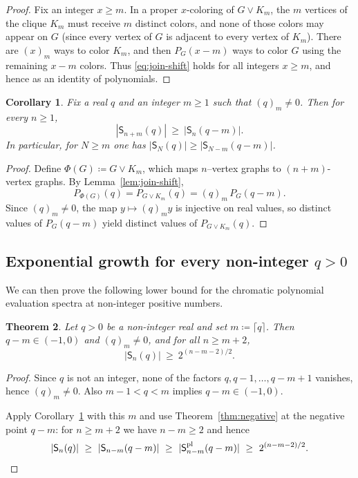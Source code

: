 \documentclass[A4paper,reqno,oneside,12pt]{amsart}
\theoremstyle{plain}
\newtheorem{theorem}{Theorem}[section]
\newtheorem{corollary}[theorem]{Corollary}
\theoremstyle{definition}
\DeclareMathOperator{\pl}{\mathrm{pl}}
\begin{document}
\begin{proof}
Fix an integer $x\ge m$.
In a proper $x$-coloring of $G\vee K_m$, the $m$ vertices of the clique $K_m$ must receive $m$ distinct colors,
and none of those colors may appear on $G$ (since every vertex of $G$ is adjacent to every vertex of $K_m$).
There are $(x)_m$ ways to color $K_m$, and then $P_G(x-m)$ ways to color $G$ using the remaining $x-m$ colors.
Thus \eqref{eq:join-shift} holds for all integers $x\ge m$, and hence as an identity of polynomials.
\end{proof}

\begin{corollary}\label{cor:spectral-embed}Fix a real $q$ and an integer $m\ge 1$ such that $(q)_m\neq 0$.
Then for every $n\ge 1$,
\[
|\mathsf{S}_{n+m}(q)| \ \ge\ |\mathsf{S}_n (q-m)|.
\]
In particular, for $N\ge m$ one has $|\mathsf{S}_N (q)|\ge |\mathsf{S}_{N-m}(q-m)|$.
\end{corollary}

\begin{proof}
Define $\Phi(G)\coloneqq G\vee K_m$, which maps $n$--vertex graphs to $(n+m)$-vertex graphs.
By Lemma~\ref{lem:join-shift},
\[
P_{\Phi(G)}(q)=P_{G\vee K_m}(q)=(q)_m\,P_G(q-m).
\]
Since $(q)_m\neq 0$, the map $y\mapsto (q)_m y$ is injective on real values, so distinct values of $P_G(q-m)$
yield distinct values of $P_{G\vee K_m}(q)$.
\end{proof}

\subsection{Exponential growth for every non-integer \texorpdfstring{$q>0$}{q > 0}}
We can then prove the following lower bound for the chromatic polynomial evaluation spectra at non-integer positive numbers. 
\begin{theorem}\label{thm:noninteger-positive}
Let $q>0$ be a non-integer real and set $m\coloneqq \lceil q\rceil$.
Then $q-m\in(-1,0)$ and $(q)_m\neq 0$, and for all $n\ge m+2$,
\[
|\mathsf{S}_n (q)| \ \ge\ 2^{(n-m-2)/2}.
\]

\end{theorem}

\begin{proof}
Since $q$ is not an integer, none of the factors $q, q-1, \dots, q-m+1$ vanishes, hence $(q)_m\neq 0$.
Also $m-1<q<m$ implies $q-m\in(-1,0)$.

Apply Corollary~\ref{cor:spectral-embed} with this $m$ and use Theorem~\ref{thm:negative} at the negative point $q-m$:
for $n\ge m+2$ we have $n-m\ge 2$ and hence
\[
|\mathsf{S}_n(q)| \ \ge\ |\mathsf{S}_{n-m}(q-m)|
\ \ge\ |\mathsf{S}^{\pl}_{n-m}(q-m)|
\ \ge\  2^{(n-m-2)/2}.
\qedhere \]
\end{proof}
\end{document}
